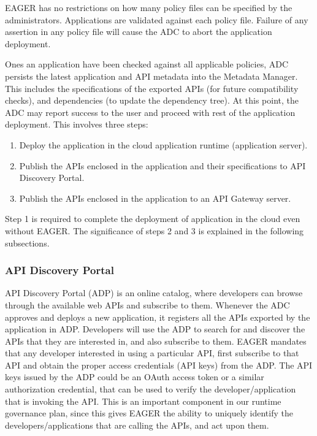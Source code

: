EAGER has no restrictions on how many policy files can be specified by the administrators. Applications are validated against each policy file. Failure of 
any assertion in any policy file will cause the ADC to abort the application deployment.

Ones an application have been checked against all applicable policies, ADC persists the latest application and API metadata into the Metadata Manager.
This includes the specifications of the exported APIs (for future compatibility checks), and dependencies (to update the dependency tree). At this point, the ADC
may report success to the user and proceed with rest of the application deployment. This involves three steps:

\begin{enumerate}
\item Deploy the application in the cloud application runtime (application server).
\item Publish the APIs enclosed in the application and their specifications to API Discovery Portal.
\item Publish the APIs enclosed in the application to an API Gateway server.
\end{enumerate}

Step 1 is required to complete the deployment of application in the cloud even without EAGER. The significance of steps 2 and 3 is explained in the 
following subsections.

\subsubsection{API Discovery Portal}
API Discovery Portal (ADP) is an online catalog, where developers can browse through the available web APIs and subscribe to them. Whenever the ADC
approves and deploys a new application, it registers all the APIs exported by the application in ADP. Developers will use the ADP to search for and discover
the APIs that they are interested in, and also subscribe to them. EAGER mandates that any developer interested in using a particular API, first subscribe to that
API and obtain the proper access credentials (API keys) from the ADP. The API keys issued by the ADP could be an OAuth access token or a similar authorization
credential, that can be used to verify the developer/application that is invoking the API. This is an important component in our runtime governance
plan, since this gives EAGER the ability to uniquely identify the developers/applications that are calling the APIs, and act upon them. 

